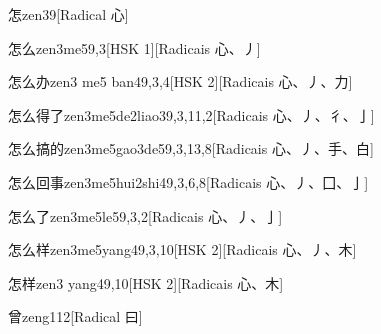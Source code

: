\begin{entry}{怎}{zen3}{9}[Radical ⼼]
\end{entry}

\begin{entry}{怎么}{zen3me5}{9,3}[HSK 1][Radicais ⼼、⼃]
\end{entry}

\begin{entry}{怎么办}{zen3 me5 ban4}{9,3,4}[HSK 2][Radicais ⼼、⼃、⼒]
\end{entry}

\begin{entry}{怎么得了}{zen3me5de2liao3}{9,3,11,2}[Radicais ⼼、⼃、⼻、⼅]
\end{entry}

\begin{entry}{怎么搞的}{zen3me5gao3de5}{9,3,13,8}[Radicais ⼼、⼃、⼿、⽩]
\end{entry}

\begin{entry}{怎么回事}{zen3me5hui2shi4}{9,3,6,8}[Radicais ⼼、⼃、⼞、⼅]
\end{entry}

\begin{entry}{怎么了}{zen3me5le5}{9,3,2}[Radicais ⼼、⼃、⼅]
\end{entry}

\begin{entry}{怎么样}{zen3me5yang4}{9,3,10}[HSK 2][Radicais ⼼、⼃、⽊]
\end{entry}

\begin{entry}{怎样}{zen3 yang4}{9,10}[HSK 2][Radicais ⼼、⽊]
\end{entry}

\begin{entry}{曾}{zeng1}{12}[Radical ⽈]
\end{entry}

